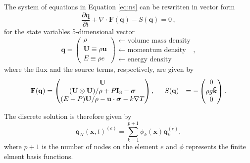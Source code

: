 The system of equations in Equation \ref{eq:ns} can be rewritten in vector form
\begin{equation}
   \frac{\partial \mathbf{q}}{\partial t} + \nabla \cdot \mathbf{F}(\mathbf{q}) -S(\mathbf{q}) = 0 \, ,
\label{eq:vector-ns}
\end{equation}
for the state variables 5-dimensional vector
\begin{equation}
    \mathbf{q} =
           \begin{pmatrix}
               \rho \\
               \mathbf{U} \equiv \rho \mathbf{u}\\
               E \equiv \rho e
           \end{pmatrix}
           \begin{array}{l}
               \leftarrow\textrm{ volume mass density}\\
               \leftarrow\textrm{ momentum density}\\
               \leftarrow\textrm{ energy density}
           \end{array},
\end{equation}
where the flux and the source terms, respectively, are given by
\begin{equation}
    \begin{aligned}
    \mathbf{F}(\mathbf{q}) &=
    \begin{pmatrix}
        \mathbf{U}\\
        {(\mathbf{U} \otimes \mathbf{U})}/{\rho} + P \mathbf{I}_3 -  \boldsymbol{\sigma} \\
        {(E + P)\mathbf{U}}/{\rho} - \mathbf{u}  \cdot \boldsymbol{\sigma} - k \nabla T
    \end{pmatrix} ,\hspace{5mm}
    S(\mathbf{q}) &=
    - \begin{pmatrix}
        0\\
        \rho g \mathbf{\hat{k}}\\
        0
    \end{pmatrix}.
    \end{aligned}
\end{equation}

The discrete solution is therefore given by
\begin{equation}
   \mathbf{q}_N (\mathbf{x},t)^{(e)} = \sum_{k = 1}^{p + 1}\phi_k (\mathbf{x})\mathbf{q}_k^{(e)},
\end{equation}
where $p + 1$ is the number of nodes on the element $e$ and $\phi$ represents the finite elment basis functions.

